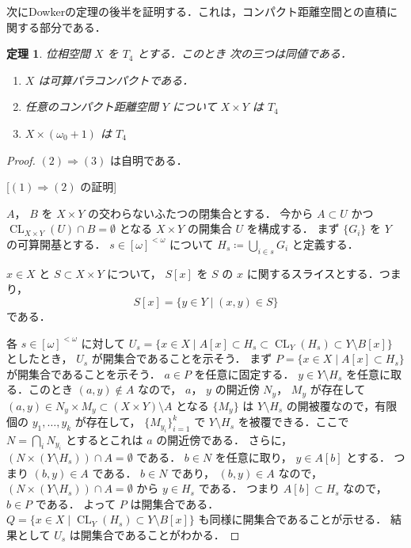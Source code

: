 \documentclass[leqno, 12pt]{ltjsarticle}
\newtheorem{thm}{定理}
\newcommand{\To}{\Longrightarrow}
\newcommand{\FinSubsets}[1]{[#1]^{<\omega}}
\newcommand{\slice}[2]{#1[#2]}
\newcommand{\omegazero}{\omega_{0}}
\DeclareMathOperator{\cl}{CL}
\begin{document}
次にDowkerの定理の後半を証明する．これは，コンパクト距離空間との直積に関する部分である．

\begin{thm}\label{thm:Dowker2}
位相空間
$X$
を
$T_{4}$
とする．このとき
次の三つは同値である．
\begin{enumerate}[label=\textup{(\arabic*)}]
\item
$X$
は可算パラコンパクトである．
\item 任意のコンパクト距離空間
$Y$
について
$X\times Y$
は
$T_{4}$
\item
$X\times (\omegazero+1)$
は
$T_{4}$
\end{enumerate}
\end{thm}

\begin{proof}
$(2)\To (3)$
は自明である．

[$(1)\To (2)$
の証明]

$A$，
$B$
を
$X\times Y$
の交わらないふたつの閉集合とする．
今から
$A\subset U$
かつ
$\cl_{X\times Y}(U)\cap B=\emptyset$
となる
$X\times Y$
の開集合
$U$
を構成する．
まず
$\{G_{i}\}$
を
$Y$
の可算開基とする．
$s\in \FinSubsets{\omega}$
について
$H_{s}\coloneqq\bigcup_{i\in s}G_{i}$
と定義する．

$x\in X$
と
$S\subset X\times Y$
について，
$\slice{S}{x}$
を
$S$
の
$x$
に関するスライスとする．つまり，
\[
\slice{S}{x}=\{y\in Y \mid (x,y)\in S\}
\]
である．

各
$s\in \FinSubsets{\omega}$
に対して
$U_{s}=\{x\in X \mid \slice{A}{x}\subset H_{s}\subset \cl_{Y}(H_{s})\subset Y\setminus \slice{B}{x}\}$
としたとき，
$U_{s}$
が開集合であることを示そう．
まず
$P=\{x\in X \mid \slice{A}{x}\subset H_{s}\}$
が開集合であることを示そう．
$a\in P$
を任意に固定する．
$y\in Y\setminus H_{s}$
を任意に取る．このとき
$(a, y)\notin A$
なので，
$a$，
$y$
の開近傍
$N_{y}$，
$M_{y}$
が存在して
$(a,y)\in N_{y}\times M_{y}\subset (X\times Y)\setminus A$
となる
$\{M_{y}\}$
は
$Y\setminus H_{s}$
の開被覆なので，有限個の
$y_{1},\dots, y_{k}$
が存在して，
$\{M_{y_{i}}\}_{i=1}^{k}$
で
$Y\setminus H_{s}$
を被覆できる．ここで
$N=\bigcap_{i} N_{y_{i}}$
とするとこれは
$a$
の開近傍である．
さらに，
$(N\times (Y\setminus H_{s}))\cap A=\emptyset$
である．
$b\in N$
を任意に取り，
$y\in \slice{A}{b}$
とする．
つまり
$(b, y)\in A$
である．
$b\in N$
であり，
$(b,y)\in A$
なので，
$(N\times (Y\setminus H_{s}))\cap A=\emptyset$
から
$y\in H_{s}$
である．
つまり
$\slice{A}{b}\subset H_{s}$
なので，
$b\in P$
である．
よって
$P$
は開集合である．
$Q=\{x\in X \mid \cl_{Y}(H_{s})\subset Y\setminus \slice{B}{x}\}$
も同様に開集合であることが示せる．
結果として
$U_{s}$
は開集合であることがわかる．




\end{proof}
\end{document}
